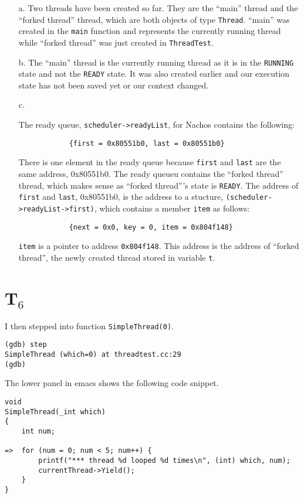 \documentclass[letterpaper, 10pt]{article}
\begin{document}
	\begin{itemize}
		\item[a.]{
		Two threads have been created so far. They are the ``main'' thread and the ``forked thread'' thread, which are both objects of type {\tt Thread}. ``main'' was created in the {\tt main} function and represents the currently running thread while ``forked thread'' was just created in {\tt ThreadTest}.
		}
		\item[b.]{
		The ``main'' thread is the currently running thread as it is in the {\tt RUNNING} state and not the {\tt READY} state. It was also created earlier and our execution state has not been saved yet or our context changed.
		}
		\item[c.]{
		The ready queue, {\tt *scheduler->readyList}, for Nachos contains the following:

		\begin{verbatim}
			{first = 0x80551b0, last = 0x80551b0}
		\end{verbatim}

		There is one element in the ready queue because {\tt first} and {\tt last} are the same address, 0x80551b0. The ready queueu contains the ``forked thread'' thread, which makes sense as ``forked thread'''s state is {\tt READY}. The address of {\tt first} and {\tt last}, 0x80551b0, is the address to a stucture, {\tt *(scheduler->readyList->first)}, which contains a member {\tt item} as follows:

		\begin{verbatim}
			{next = 0x0, key = 0, item = 0x804f148}
		\end{verbatim}

		{\tt item} is a pointer to address {\tt 0x804f148}. This address is the address of ``forked thread'', the newly created thread stored in variable {\tt t}.
		}
	\end{itemize}

	\section*{T$_6$}

	I then stepped into function {\tt SimpleThread(0)}.

	\begin{verbatim}
(gdb) step
SimpleThread (which=0) at threadtest.cc:29
(gdb)
	\end{verbatim}

	The lower panel in emacs shows the following code snippet.

	\begin{verbatim}
void
SimpleThread(_int which)
{
    int num;

=>  for (num = 0; num < 5; num++) {
        printf("*** thread %d looped %d times\n", (int) which, num);
        currentThread->Yield();
    }
}
	\end{verbatim}
\end{document}
